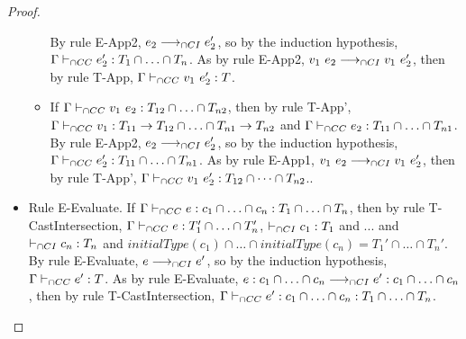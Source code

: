 \documentclass[a4paper]{article}
\begin{document}
\begin{proof}
\begin{itemize}
\begin{itemize}
        By rule E-App2, $e_2 \longrightarrow_{\cap CI} e_2'$, so by the induction hypothesis, $\Gamma \vdash_{\cap CC} e_2' : T_1 \cap \ldots \cap T_n$.
        As by rule E-App2, $v_1\ e_2 \longrightarrow_{\cap CI} v_1\ e_2'$, then by rule T-App, $\Gamma \vdash_{\cap CC} v_1\ e_2' : T$.
        \item If $\Gamma \vdash_{\cap CC} v_1\ e_2 : T_{12} \cap \ldots \cap T_{n2}$, then by rule T-App', $\Gamma \vdash_{\cap CC} v_1 : T_{11} \rightarrow T_{12} \cap \ldots \cap T_{n1} \rightarrow T_{n2}$ and $\Gamma \vdash_{\cap CC} e_2 : T_{11} \cap \ldots \cap T_{n1}$.
        By rule E-App2, $e_2 \longrightarrow_{\cap CI} e_2'$, so by the induction hypothesis, $\Gamma \vdash_{\cap CC} e_2' : T_{11} \cap \ldots \cap T_{n1}$.
        As by rule E-App1, $v_1\ e_2 \longrightarrow_{\cap CI} v_1\ e_2'$, then by rule T-App', $\Gamma \vdash_{\cap CC} v_1\ e_2' : T_{12} \cap \dots \cap T_{n2}$..
    \end{itemize}
    \item Rule E-Evaluate. If $\Gamma \vdash_{\cap CC} e : c_1 \cap \ldots \cap c_n : T_1 \cap \ldots \cap T_n$, then by rule T-CastIntersection, $\Gamma \vdash_{\cap CC} e : T_1' \cap \ldots \cap T_n'$, $\vdash_{\cap CI} c_1 : T_1$ and ... and $\vdash_{\cap CI} c_n : T_n$ and $initialType(c_1) \cap \ldots \cap initialType(c_n) = T_1' \cap \ldots \cap T_n'$.
    By rule E-Evaluate, $e \longrightarrow_{\cap CI} e'$, so by the induction hypothesis, $\Gamma \vdash_{\cap CC} e' : T$.
    As by rule E-Evaluate, $e : c_1 \cap \ldots \cap c_n \longrightarrow_{\cap CI} e' : c_1 \cap \ldots \cap c_n$, then by rule T-CastIntersection, $\Gamma \vdash_{\cap CC} e' : c_1 \cap \ldots \cap c_n : T_1 \cap \ldots \cap T_n$.
\end{itemize}
\end{proof}
\end{document}
